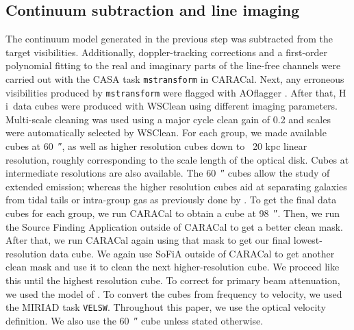 \documentclass{aa}
\newcommand{\HI}{H\,{\sc i}}
\begin{document}
\subsection{Continuum subtraction and line imaging}
The continuum model generated in the previous step was subtracted from the target visibilities. Additionally, doppler-tracking corrections and a first-order 
polynomial fitting to the real and imaginary parts of the line-free channels were carried out with the CASA task \texttt{mstransform} in CARACal. 
Next, any erroneous visibilities produced by \texttt{mstransform} were flagged with AOflagger \citep{2023A&A...673A.146S}. After that, \HI\ data cubes 
were produced with WSClean using different imaging parameters. Multi-scale cleaning was used using a major cycle 
clean gain of 0.2 and scales were automatically selected by WSClean. For each group, we made available cubes at \SI{60}{\arcsecond}, as well as higher resolution cubes down to ~20 kpc linear resolution, roughly corresponding to the scale length of the optical disk. 
Cubes at intermediate resolutions are also available. The \SI{60}{\arcsecond} cubes allow the study of extended emission; whereas the higher resolution cubes aid at separating galaxies from tidal tails or intra-group 
gas as previously done by \citet{2023A&A...670A..21J}. To get the final data cubes for each group, we run CARACal to obtain a cube at \SI{98}{\arcsecond}. Then, 
we run the Source Finding Application \citep[SoFiA,][]{2015MNRAS.448.1922S, 2021MNRAS.506.3962W} outside of CARACal to get a better clean mask. 
After that, we run CARACal again using that mask to get our 
final lowest-resolution data cube. We again use SoFiA outside of CARACal to get another clean mask and use it to clean the next higher-resolution cube. We proceed like this 
until the highest resolution cube. To correct for primary beam attenuation, we used the model of \citet{2020ApJ...888...61M}. To convert the cubes from frequency to velocity, 
we used the MIRIAD task \texttt{VELSW}. Throughout this paper, we use the optical velocity definition. We also use the \SI{60}{\arcsecond} cube unless stated otherwise. 
\end{document}
